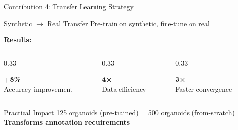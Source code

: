 \documentclass[aspectratio=169]{beamer}
\begin{document}
\begin{frame}{Contribution 4: Transfer Learning Strategy}
    \begin{block}{Synthetic $\rightarrow$ Real Transfer}
        Pre-train on synthetic, fine-tune on real
    \end{block}
    
    \vspace{0.5em}
    \textbf{Results:}
    \begin{columns}
        \begin{column}{0.33\textwidth}
            \begin{center}
                {\Large \textbf{+8\%}}\\
                Accuracy improvement
            \end{center}
        \end{column}
        \begin{column}{0.33\textwidth}
            \begin{center}
                {\Large \textbf{4×}}\\
                Data efficiency
            \end{center}
        \end{column}
        \begin{column}{0.33\textwidth}
            \begin{center}
                {\Large \textbf{3×}}\\
                Faster convergence
            \end{center}
        \end{column}
    \end{columns}
    
    \vspace{0.5em}
    \begin{alertblock}{Practical Impact}
        125 organoids (pre-trained) = 500 organoids (from-scratch)\\
        \textbf{Transforms annotation requirements}
    \end{alertblock}
\end{frame}
\end{document}

